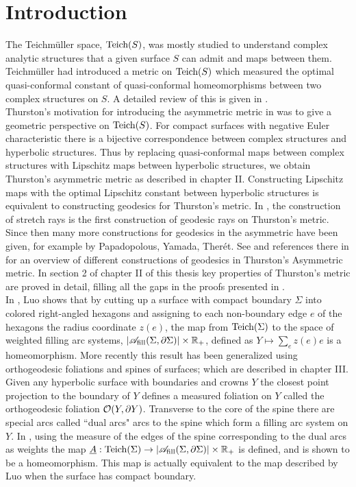 \chapter*{Introduction}
The Teichm\"{u}ller space, $\text{Teich}(S)$, was mostly studied to understand complex analytic structures that a given surface $S$ can admit and maps between them. Teichm\"{u}ller had introduced a metric on $\text{Teich}(S)$ which measured the optimal quasi-conformal constant of quasi-conformal homeomorphisms between two complex structures on $S$. A detailed review of this is given in \cite{primer}.\\

Thurston's motivation for introducing the asymmetric metric in \cite{thurston} was to give a geometric perspective on $\text{Teich}(S)$. For compact surfaces with negative Euler characteristic there is a bijective correspondence between complex structures and hyperbolic structures. Thus by replacing quasi-conformal maps between complex structures with Lipschitz maps between hyperbolic structures, we obtain Thurston's asymmetric metric as described in chapter II. Constructing Lipschitz maps with the optimal Lipschitz constant between hyperbolic structures is equivalent to constructing geodesics for Thurston's metric. In \cite{thurston}, the construction of stretch rays is the first construction of geodesic rays on Thurston's metric. Since then many more constructions for geodesics in the asymmetric have been given, for example by Papadopolous, Yamada, Ther\'{e}t. See \cite{survey} and references there in for an overview of different constructions of geodesics in Thurston's Asymmetric metric. In section 2 of chapter II of this thesis key properties of Thurston's metric are proved in detail, filling all the gaps in the proofs presented in \cite{thurston}.\\

In \cite{luo}, Luo shows that by cutting up a surface with compact boundary $\Sigma$ into colored right-angled hexagons and assigning to each non-boundary edge $e$ of the hexagons the radius coordinate $z(e)$, the map from $\text{Teich}(\Sigma)$ to the space of weighted filling arc systems, $|\mathscr{A}_{\text{fill}}(\Sigma,\partial \Sigma)|\times \mathbb{R}_{+}$,  defined as $Y\mapsto \sum_{e} z(e) e$ is a homeomorphism. More recently this result has been generalized using orthogeodesic foliations and spines of surfaces; which are described in chapter III. Given any hyperbolic surface with boundaries and crowns $Y$ the closest point projection to the boundary of $Y$ defines a measured foliation on $Y$ called the orthogeodesic foliation $ \mathcal{O}(Y,\partial Y)$. Transverse to the core of the spine there are special arcs called ``dual arcs" arcs to the spine which form a filling arc system on $Y$. In \cite{farre}, using the measure of the edges of the spine corresponding to the dual arcs as weights the map $\underline{A}:\text{Teich}(\Sigma)\to |\mathscr{A}_{\text{fill}}(\Sigma,\partial \Sigma)|\times \mathbb{R}_{+}$ is defined, and is shown to be a homeomorphism. This map is actually equivalent to the map described by Luo when the surface has compact boundary.\\


